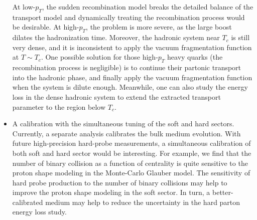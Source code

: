 \begin{itemize}
At low-$p_T$, the sudden recombination model breaks the detailed balance of the transport model and dynamically treating the recombination process would be desirable.
At high-$p_T$, the problem is more severe, as the large boost dilates the hadronization time. 
Moreover, the hadronic system near $T_c$ is still very dense, and it is inconsistent to apply the vacuum fragmentation function at $T\sim T_c$.
One possible solution for those high-$p_T$ heavy quarks (the recombination process is negligible) is to continue their partonic transport into the hadronic phase, and finally apply the vacuum fragmentation function when the system is dilute enough.
Meanwhile, one can also study the energy loss in the dense hadronic system to extend the extracted transport parameter to the region below $T_c$.
\item A calibration with the simultaneous tuning of the soft and hard sectors. Currently, a separate analysis calibrates the bulk medium evolution. With future high-precision hard-probe measurements, a simultaneous calibration of both soft and hard sector would be interesting.
For example, we find that the number of binary collision as a function of centrality is quite sensitive to the proton shape modeling in the Monte-Carlo Glauber model. 
The sensitivity of hard probe production to the number of binary collisions may help to improve the proton shape modeling in the soft sector. 
In turn, a better-calibrated medium may help to reduce the uncertainty in the hard parton energy loss study.
\end{itemize}
